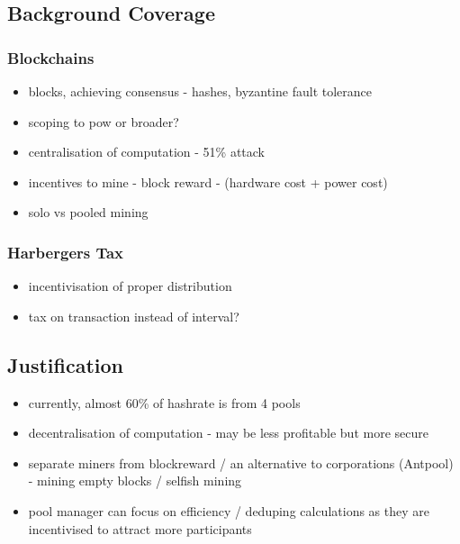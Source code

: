 
\subsection{Background Coverage}


\subsubsection{Blockchains}

\begin{itemize}
  \item blocks, achieving consensus - hashes, byzantine fault tolerance
  \item scoping to pow or broader?
  \item centralisation of computation - 51\% attack
  \item incentives to mine - block reward - (hardware cost + power cost)
  \item solo vs pooled mining
\end{itemize}

\subsubsection{Harbergers Tax}

\begin{itemize}
  \item incentivisation of proper distribution
  \item tax on transaction instead of interval?
\end{itemize}

\subsection{Justification} %

\begin{itemize}
  \item currently, almost 60\% of hashrate is from 4 pools %
  \item decentralisation of computation - may be less profitable but more secure
  \item separate miners from blockreward / an alternative to corporations (Antpool) - mining empty blocks / selfish mining
  \item pool manager can focus on efficiency / deduping calculations as they are incentivised to attract more participants
\end{itemize}

